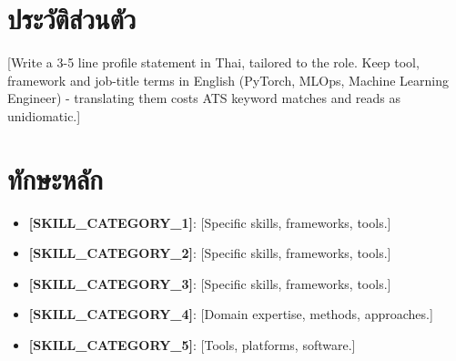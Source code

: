 \documentclass[11pt,a4paper,sans]{moderncv}
\begin{document}
\makecvtitle
{}


\section{ประวัติส่วนตัว}
\vspace{1pt}
\small{[Write a 3-5 line profile statement in Thai, tailored to the role. Keep
tool, framework and job-title terms in English (PyTorch, MLOps, Machine Learning
Engineer) - translating them costs ATS keyword matches and reads as unidiomatic.]}


\section{ทักษะหลัก}
\vspace{1pt}
\begin{itemize}

\item \textbf{[SKILL_CATEGORY_1]}: [Specific skills, frameworks, tools.]

\item \textbf{[SKILL_CATEGORY_2]}: [Specific skills, frameworks, tools.]

\item \textbf{[SKILL_CATEGORY_3]}: [Specific skills, frameworks, tools.]

\item \textbf{[SKILL_CATEGORY_4]}: [Domain expertise, methods, approaches.]

\item \textbf{[SKILL_CATEGORY_5]}: [Tools, platforms, software.]

\end{itemize}

\end{document}
